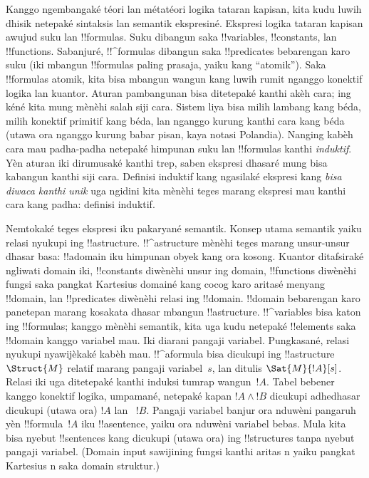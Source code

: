 \documentclass[../../../include/open-logic-section]{subfiles}
\begin{document}


Kanggo ngembangaké téori lan métatéori logika tataran kapisan,
kita kudu luwih dhisik netepaké sintaksis lan semantik
ekspresiné. Ekspresi logika tataran kapisan awujud suku lan
!!{formula}s. Suku dibangun saka !!{variable}s, !!{constant}s,
lan !!{function}s. Sabanjuré, !!^{formula}s dibangun saka
!!{predicate}s bebarengan karo suku (iki mbangun !!{formula}s
paling prasaja, yaiku kang ``atomik''). Saka !!{formula}s atomik,
kita bisa mbangun wangun kang luwih rumit nganggo konektif
logika lan kuantor. Aturan pambangunan bisa ditetepaké kanthi
akèh cara; ing kéné kita mung mènèhi salah siji cara.
Sistem liya bisa milih lambang kang béda, milih konektif
primitif kang béda, lan nganggo kurung kanthi cara kang béda
(utawa ora nganggo kurung babar pisan, kaya notasi Polandia).
Nanging kabèh cara mau padha-padha netepaké himpunan suku lan
!!{formula}s kanthi \emph{induktif}. Yèn aturan iki dirumusaké
kanthi trep, saben ekspresi dhasaré mung bisa kabangun kanthi
siji cara. Definisi induktif kang ngasilaké ekspresi kang
\emph{bisa diwaca kanthi unik} uga ngidini kita mènèhi teges
marang ekspresi mau kanthi cara kang padha: definisi induktif.

Nemtokaké teges ekspresi iku pakaryané semantik. Konsep
utama semantik yaiku relasi nyukupi ing !!a{structure}.
!!^a{structure} mènèhi teges marang unsur-unsur dhasar basa:
!!a{domain} iku himpunan obyek kang ora kosong. Kuantor
ditafsiraké ngliwati domain iki, !!{constant}s diwènèhi
unsur ing domain, !!{function}s diwènèhi fungsi saka
pangkat Kartesius domainé kang cocog karo aritasé menyang
!!{domain}, lan !!{predicate}s diwènèhi relasi ing
!!{domain}. !!{domain} bebarengan karo panetepan marang
kosakata dhasar mbangun !!a{structure}. !!^{variable}s bisa
katon ing !!{formula}s; kanggo mènèhi semantik, kita uga
kudu netepaké !!{element}s saka !!{domain} kanggo variabel mau.
Iki diarani pangaji variabel. Pungkasané, relasi nyukupi
nyawijèkaké kabèh mau. !!^a{formula} bisa dicukupi ing
!!a{structure}~$\Struct{M}$ relatif marang pangaji variabel~$s$,
lan ditulis $\Sat{M}{!A}[s]$. Relasi iki uga ditetepaké
kanthi induksi tumrap wangun~$!A$. Tabel bebener kanggo
konektif logika, umpamané, netepaké kapan $!A \land !B$
dicukupi adhedhasar dicukupi (utawa ora) $!A$ lan ~$!B$.
Pangaji variabel banjur ora nduwèni pangaruh yèn
!!{formula}~$!A$ iku !!a{sentence}, yaiku ora nduwèni
variabel bebas. Mula kita bisa nyebut !!{sentence}s kang
dicukupi (utawa ora) ing !!{structure}s tanpa nyebut
pangaji variabel.
(Domain input sawijining fungsi kanthi aritas n yaiku pangkat Kartesius n saka domain struktur.)
\end{document}
